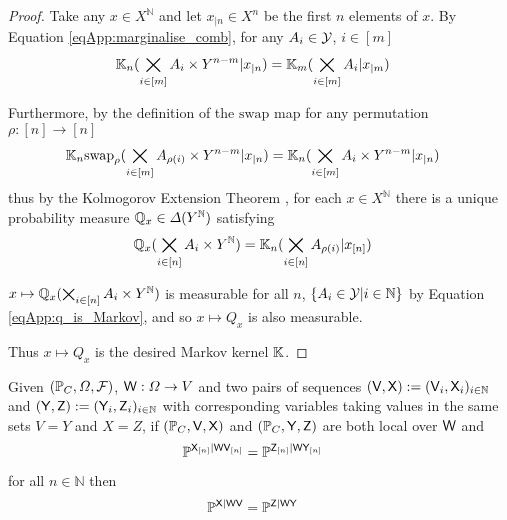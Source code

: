 \begin{proof}
Take any $x\in X^{\mathbb{N}}$ and let $x_{|n}\in X^n$ be the first $n$ elements of $x$. By Equation \eqref{eqApp:marginalise_comb}, for any $A_i\in \mathcal{Y}$, $i\in [m]$
\begin{align}
    \mathbb{K}_n(\bigtimes_{i\in [m]}A_i\times Y^{n-m}|x_{|n}) &= \mathbb{K}_m(\bigtimes_{i\in [m]}A_i|x_{|m})
\end{align}

Furthermore, by the definition of the $\mathrm{swap}$ map for any permutation $\rho:[n]\to[n]$
\begin{align}
    \mathbb{K}_n\mathrm{swap}_{\rho}(\bigtimes_{i\in [m]}A_{\rho(i)}\times Y^{n-m}|x_{|n}) &= \mathbb{K}_n(\bigtimes_{i\in [m]}A_{i}\times Y^{n-m}|x_{|n})
\end{align}
thus by the Kolmogorov Extension Theorem \citep{cinlar_probability_2011}, for each $x\in X^{\mathbb{N}}$ there is a unique probability measure $\mathbb{Q}_x\in \Delta(Y^{\mathbb{N}})$ satisfying
\begin{align}
    \mathbb{Q}_x(\bigtimes_{i\in [n]}A_i\times Y^{\mathbb{N}}) &= \mathbb{K}_n(\bigtimes_{i\in [n]}A_{\rho(i)}|x_{[n]})\label{eqApp:q_is_Markov}
\end{align}

$x\mapsto \mathbb{Q}_x(\bigtimes_{i\in[n]} A_i\times Y^{\mathbb{N}})$ is measurable for all $n$, $\{A_i\in\mathcal{Y}|i\in \mathbb{N}\}$ by Equation \eqref{eqApp:q_is_Markov}, and so $x\mapsto Q_x$ is also measurable.

Thus $x\mapsto Q_x$ is the desired Markov kernel $\mathbb{K}$.
\end{proof}

\begin{corollary}\label{cor:equal_subconditionals}
Given $(\mathbb{P}_C,\Omega,\mathcal{F})$, $\mathsf{W}:\Omega\to V$ and two pairs of sequences $(\mathsf{V},\mathsf{X}):=(\mathsf{V}_i,\mathsf{X}_i)_{i\in\mathbb{N}}$ and $(\mathsf{Y},\mathsf{Z}):=(\mathsf{Y}_i,\mathsf{Z}_i)_{i\in \mathbb{N}}$ with corresponding variables taking values in the same sets $V=Y$ and $X=Z$, if $(\mathbb{P}_C,\mathsf{V},\mathsf{X})$ and $(\mathbb{P}_C,\mathsf{Y},\mathsf{Z})$ are both local over $\mathsf{W}$ and
\begin{align}
    \mathbb{P}^{\mathsf{X}_{[n]}|\mathsf{W}\mathsf{V}_{[n]}} &= \mathbb{P}^{\mathsf{Z}_{[n]}|\mathsf{W}\mathsf{Y}_{[n]}}
\end{align}
for all $n\in\mathbb{N}$ then
\begin{align}
    \mathbb{P}^{\mathsf{X}|\mathsf{W}\mathsf{V}} &= \mathbb{P}^{\mathsf{Z}|\mathsf{W}\mathsf{Y}}
\end{align}
\end{corollary}

